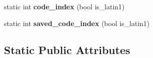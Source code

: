 \begin{DoxyCompactItemize}
\item 
static int {\bfseries code\+\_\+index} (bool is\+\_\+latin1)\hypertarget{classv8_1_1internal_1_1_j_s_reg_exp_acd840e0e9e9c2f14d1b7093d189fd78e}{}\label{classv8_1_1internal_1_1_j_s_reg_exp_acd840e0e9e9c2f14d1b7093d189fd78e}

\item 
static int {\bfseries saved\+\_\+code\+\_\+index} (bool is\+\_\+latin1)\hypertarget{classv8_1_1internal_1_1_j_s_reg_exp_acb6628e243f87edee20df1ed64ae03a7}{}\label{classv8_1_1internal_1_1_j_s_reg_exp_acb6628e243f87edee20df1ed64ae03a7}

\end{DoxyCompactItemize}
\subsection*{Static Public Attributes}
